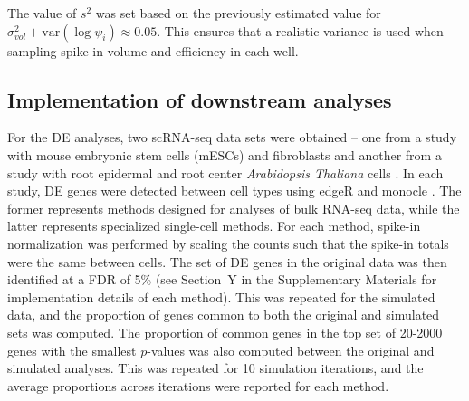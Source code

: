 \documentclass{article}
\begin{document}


The value of $s^2$ was set based on the previously estimated value for $\sigma^2_{vol} + \mbox{var}(\log \psi_{i}) \approx 0.05$.
This ensures that a realistic variance is used when sampling spike-in volume and efficiency in each well.

\subsection{Implementation of downstream analyses}
For the DE analyses, two scRNA-seq data sets were obtained -- one from a study with mouse embryonic stem cells (mESCs) and fibroblasts \cite{islam2011characterization} and another from a study with root epidermal and root center \textit{Arabidopsis Thaliana} cells \cite{brennecke2013accounting}.
In each study, DE genes were detected between cell types using edgeR \cite{robinson2010edgeR,lund2012detecting} and monocle \cite{trapnell2014dynamics}.
The former represents methods designed for analyses of bulk RNA-seq data, while the latter represents specialized single-cell methods.
For each method, spike-in normalization was performed by scaling the counts such that the spike-in totals were the same between cells.
The set of DE genes in the original data was then identified at a FDR of 5\% (see Section~Y in the Supplementary Materials for implementation details of each method).
This was repeated for the simulated data, and the proportion of genes common to both the original and simulated sets was computed.
The proportion of common genes in the top set of 20-2000 genes with the smallest $p$-values was also computed between the original and simulated analyses.
This was repeated for 10 simulation iterations, and the average proportions across iterations were reported for each method.
\end{document}
